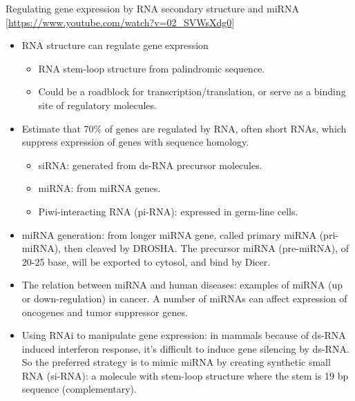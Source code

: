 \documentclass{report}
\begin{document}
Regulating gene expression by RNA secondary structure and miRNA 
[\url{https://www.youtube.com/watch?v=02_SVWsXdg0}]
\begin{itemize}
	\item RNA structure can regulate gene expression
	\begin{itemize}
		\item RNA stem-loop structure from palindromic sequence. 
		\item Could be a roadblock for transcription/translation, or serve as a binding site of regulatory molecules. 
	\end{itemize}
	
	\item Estimate that 70\% of genes are regulated by RNA, often short RNAs, which suppress expression of genes with sequence homology.
	\begin{itemize}
		\item siRNA: generated from ds-RNA precursor molecules.
		\item miRNA: from miRNA genes. 
		\item Piwi-interacting RNA (pi-RNA): expressed in germ-line cells. 
	\end{itemize}
	
	\item miRNA generation: from longer miRNA gene, called primary miRNA (pri-miRNA), then cleaved by DROSHA. The precursor miRNA (pre-miRNA), of 20-25 base, will be exported to cytosol, and bind by Dicer.
	
	\item The relation between miRNA and human diseases: examples of miRNA (up or down-regulation) in cancer. A number of miRNAs can affect expression of oncogenes and tumor suppressor genes. 
	
	\item Using RNAi to manipulate gene expression: in mammals because of ds-RNA induced interferon response, it's difficult to induce gene silencing by ds-RNA. So the preferred strategy is to mimic miRNA by creating synthetic small RNA (si-RNA): a molecule with stem-loop structure where the stem is 19 bp sequence (complementary). 
\end{itemize}
\end{document}

